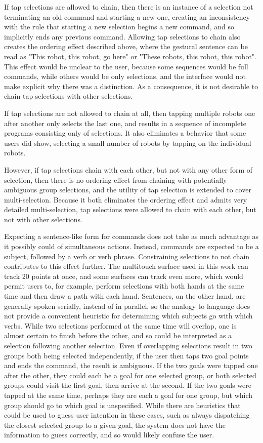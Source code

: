 If tap selections are allowed to chain, then there is an instance of a selection not terminating an old command and starting a new one, creating an inconsistency with the rule that starting a new selection begins a new command, and so implicitly ends any previous command.
Allowing tap selections to chain also creates the ordering effect described above, where the gestural sentence can be read as "This robot, this robot, go here" or "These robots, this robot, this robot". 
This effect would be unclear to the user, because some sequences would be full commands, while others would be only selections, and the interface would not make explicit why there was a distinction. 
As a consequence, it is not desirable to chain tap selections with other selections. 

If tap selections are not allowed to chain at all, then tapping multiple robots one after another only selects the last one, and results in a sequence of incomplete programs consisting only of selections. 
It also eliminates a behavior that some users did show, selecting a small number of robots by tapping on the individual robots. 

However, if tap selections chain with each other, but not with any other form of selection, then there is no ordering effect from chaining with potentially ambiguous group selections, and the utility of tap selection is extended to cover multi-selection. 
Because it both eliminates the ordering effect and admits very detailed multi-selection, tap selections were allowed to chain with each other, but not with other selections. 

Expecting a sentence-like form for commands does not take as much advantage as it possibly could of simultaneous actions. 
Instead, commands are expected to be a subject, followed by a verb or verb phrase. 
Constraining selections to not chain contributes to this effect further. 
The multitouch surface used in this work can track 20 points at once, and some surfaces can track even more, which would permit users to, for example, perform selections with both hands at the same time and then draw a path with each hand. 
Sentences, on the other hand, are generally spoken serially, instead of in parallel, so the analogy to language does not provide a convenient heuristic for determining which subjects go with which verbs.
While two selections performed at the same time will overlap, one is almost certain to finish before the other, and so could be interpreted as a selection following another selection. 
Even if overlapping selections result in two groups both being selected independently, if the user then taps two goal points and ends the command, the result is ambiguous. 
If the two goals were tapped one after the other, they could each be a goal for one selected group, or both selected groups could visit the first goal, then arrive at the second. 
If the two goals were tapped at the same time, perhaps they are each a goal for one group, but which group should go to which goal is unspecified.  
While there are heuristics that could be used to guess user intention in these cases, such as always dispatching the closest selected group to a given goal, the system does not have the information to guess correctly, and so would likely confuse the user. 

